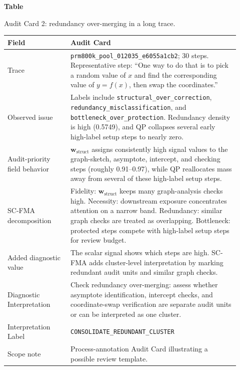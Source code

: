 \documentclass[a4paper,fleqn]{cas-sc}
\newcommand{\wstruct}{\ensuremath{\mathbf{w}_{\mathrm{struct}}}}
\begin{document}
\clearpage
\par\medskip
{}\label{tab:audit-card-redundancy}
\noindent\textbf{Table~\thetable}\par
\noindent Audit Card 2: redundancy over-merging in a long trace.
\begin{center}
\small
\renewcommand{\arraystretch}{1.08}
\begin{tabular}{p{0.25\linewidth}p{0.67\linewidth}}
\toprule
\textbf{Field} & \textbf{Audit Card} \\
\midrule
Trace & \texttt{prm800k\_pool\_012035\_e6055a1cb2}; 30 steps. Representative step: ``One way to do that is to pick a random value of $x$ and find the corresponding value of $y=f(x)$, then swap the coordinates.'' \\
Observed issue & Labels include \texttt{structural\_over\_correction}, \texttt{redundancy\_misclassification}, and \texttt{bottleneck\_over\_protection}. Redundancy density is high (0.5749), and QP collapses several early high-label setup steps to nearly zero. \\
Audit-priority field behavior & \wstruct{} assigns consistently high signal values to the graph-sketch, asymptote, intercept, and checking steps (roughly 0.91--0.97), while QP reallocates mass away from several of these high-label setup steps. \\
SC-FMA decomposition & Fidelity: \wstruct{} keeps many graph-analysis checks high. Necessity: downstream exposure concentrates attention on a narrow band. Redundancy: similar graph checks are treated as overlapping. Bottleneck: protected steps compete with high-label setup steps for review budget. \\
Added diagnostic value & The scalar signal shows which steps are high. SC-FMA adds cluster-level interpretation by marking redundant audit units and similar graph checks. \\
Diagnostic Interpretation & Check redundancy over-merging: assess whether asymptote identification, intercept checks, and coordinate-swap verification are separate audit units or can be interpreted as one cluster. \\
Interpretation Label & \texttt{CONSOLIDATE\_REDUNDANT\_CLUSTER} \\
Scope note & Process-annotation Audit Card illustrating a possible review template. \\
\bottomrule
\end{tabular}
\end{center}
\medskip
\end{document}
